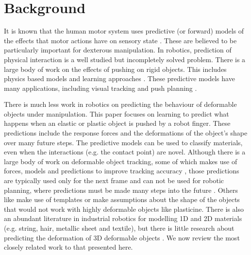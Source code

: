 \documentclass[journal]{IEEEtran}
\newcommand{\alref}[1]{Algorithm~\ref{#1}}
\newcounter{algorithm}
\begin{document}
% 

\section{Background}
\label{sec:background}

It is known that the human motor system uses predictive (or forward) models of the effects that motor actions have on sensory state \cite{flanagan03,flanagan06,johansson92}. These are believed to be particularly important for dexterous manipulation. In robotics, prediction of physical interaction is a well studied but incompletely solved problem. There is a large body of work on the effects of pushing on rigid objects. This includes physics based models \cite{lynch_mechanics_1992,peshkin_motion_1988,mason_mechanics_2001} and learning approaches \cite{montesano08,moldovan12,fitzpatrick_learning_2003,kroemer2014,Stoytchev_affordances_2008,mericli2014, scholz2010combining,kopicki-etal-icra11,kopickiwyatt16,belter2014iros}. These predictive models have many applications, including visual tracking \cite{morwald2011icra, duff2011icra, pham2015capturing} and push planning \cite{stillman08ijrr,Dogar_2010,lynchmason96,zitoetal-iros12,Cosgun2011}.

There is much less work in robotics on predicting the behaviour of deformable objects under manipulation. This paper focuses on learning to predict what happens when an elastic or plastic object is pushed by a robot finger. These predictions include the response forces and the deformations of the object's shape over many future steps. The predictive models can be used to classify materials, even when the interactions (e.g. the contact point) are novel. Although there is a large body of work on deformable object tracking, some of which makes use of forces, models and predictions to improve tracking accuracy \cite{Chan1994, Greminger2008, Alkkiomaki2009}, those predictions are typically used only for the next frame and can not be used for robotic planning, where predictions must be made many steps into the future \cite{Cretu2012}.  Others like \cite{Malassiotis1998, Cremers2006} make use of templates or make assumptions about the shape of the objects that would not work with highly deformable objects like plasticine.  There is also an abundant literature in industrial robotics for modelling 1D and 2D materials (e.g. string, hair, metallic sheet and textile), but there is little research about predicting the deformation of 3D deformable objects \cite{Khalil2010review}. We now review the most closely related work to that presented here.
\end{document}
